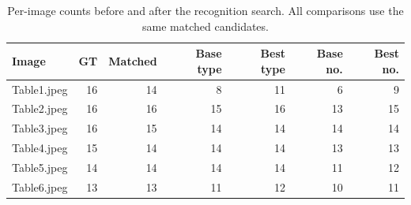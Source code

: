\begin{table}[htbp]
\centering
\small
\caption{Per-image counts before and after the recognition search. All comparisons use the same matched candidates.}
\label{tab:recognition-search-images}
\begin{tabular}{lrrrrrr}
\toprule
Image & GT & Matched & Base type & Best type & Base no. & Best no. \\
\midrule
Table1.jpeg & 16 & 14 & 8 & 11 & 6 & 9 \\
Table2.jpeg & 16 & 16 & 15 & 16 & 13 & 15 \\
Table3.jpeg & 16 & 15 & 14 & 14 & 14 & 14 \\
Table4.jpeg & 15 & 14 & 14 & 14 & 13 & 13 \\
Table5.jpeg & 14 & 14 & 14 & 14 & 11 & 12 \\
Table6.jpeg & 13 & 13 & 11 & 12 & 10 & 11 \\
\bottomrule
\end{tabular}
\end{table}
\FloatBarrier
